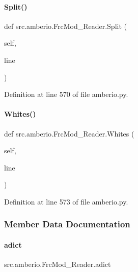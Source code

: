 \paragraph{\texorpdfstring{Split()}{Split()}}
{\footnotesize\ttfamily def src.\+amberio.\+Frc\+Mod\+\_\+\+Reader.\+Split (\begin{DoxyParamCaption}\item[{}]{self,  }\item[{}]{line }\end{DoxyParamCaption})}



Definition at line 570 of file amberio.\+py.

\mbox{\label{classsrc_1_1amberio_1_1FrcMod__Reader_a3921bf9a63d89bc3b9b325e2bf89a260}} 
\paragraph{\texorpdfstring{Whites()}{Whites()}}
{\footnotesize\ttfamily def src.\+amberio.\+Frc\+Mod\+\_\+\+Reader.\+Whites (\begin{DoxyParamCaption}\item[{}]{self,  }\item[{}]{line }\end{DoxyParamCaption})}



Definition at line 573 of file amberio.\+py.



\subsubsection{Member Data Documentation}
\mbox{\label{classsrc_1_1amberio_1_1FrcMod__Reader_a82b9c0b5a62702f5dfee3c184fc53c3a}} 
\paragraph{\texorpdfstring{adict}{adict}}
{\footnotesize\ttfamily src.\+amberio.\+Frc\+Mod\+\_\+\+Reader.\+adict}



